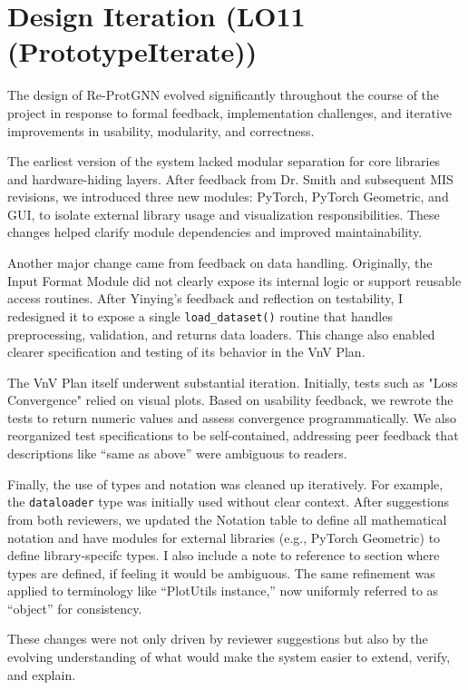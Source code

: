 \documentclass{article}
\begin{document}
\section{Design Iteration (LO11 (PrototypeIterate))}

The design of Re-ProtGNN evolved significantly throughout the course of the project in response to formal feedback, implementation challenges, and iterative improvements in usability, modularity, and correctness.

The earliest version of the system lacked modular separation for core libraries and hardware-hiding layers. After feedback from Dr. Smith and subsequent MIS revisions, we introduced three new modules: PyTorch, PyTorch Geometric, and GUI, to isolate external library usage and visualization responsibilities. These changes helped clarify module dependencies and improved maintainability.

Another major change came from feedback on data handling. Originally, the Input Format Module did not clearly expose its internal logic or support reusable access routines. After Yinying's feedback and reflection on testability, I redesigned it to expose a single \texttt{load\_dataset()} routine that handles preprocessing, validation, and returns data loaders. This change also enabled clearer specification and testing of its behavior in the VnV Plan.

The VnV Plan itself underwent substantial iteration. Initially, tests such as "Loss Convergence" relied on visual plots. Based on usability feedback, we rewrote the tests to return numeric values and assess convergence programmatically. We also reorganized test specifications to be self-contained, addressing peer feedback that descriptions like “same as above” were ambiguous to readers.

Finally, the use of types and notation was cleaned up iteratively. For example, the \texttt{dataloader} type was initially used without clear context. After suggestions from both reviewers, we updated the Notation table to define all mathematical notation and have modules for external libraries (e.g., PyTorch Geometric) to define library-specifc types. I also include a note to reference to section where types are defined, if feeling it would be ambiguous. The same refinement was applied to terminology like “PlotUtils instance,” now uniformly referred to as “object” for consistency.

These changes were not only driven by reviewer suggestions but also by the evolving understanding of what would make the system easier to extend, verify, and explain.
\end{document}
